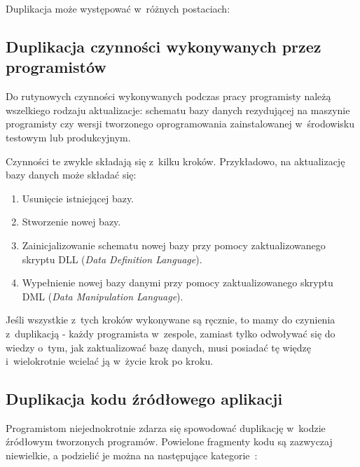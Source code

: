 Duplikacja może występować w~różnych postaciach:


\subsection{Duplikacja czynności wykonywanych przez programistów} \label{sec:tasks_dupl}

Do rutynowych czynności wykonywanych podczas pracy programisty należą wszelkiego rodzaju aktualizacje: schematu bazy danych rezydującej na maszynie programisty czy wersji tworzonego oprogramowania zainstalowanej w~środowisku testowym lub produkcyjnym.

Czynności te zwykle składają się z~kilku kroków. Przykładowo, na aktualizację bazy danych może składać się:

\begin{enumerate}
 \item Usunięcie istniejącej bazy.
 \item Stworzenie nowej bazy.
 \item Zainicjalizowanie schematu nowej bazy przy pomocy zaktualizowanego skryptu DLL (\emph{Data Definition Language}).
 \item Wypełnienie nowej bazy danymi przy pomocy zaktualizowanego skryptu DML (\emph{Data Manipulation Language}).
\end{enumerate}

Jeśli wszystkie z~tych kroków wykonywane są ręcznie, to mamy do czynienia z~duplikacją - każdy programista w~zespole, zamiast tylko odwoływać się do wiedzy o~tym, jak zaktualizować bazę danych, musi posiadać tę więdzę i~wielokrotnie wcielać ją w~życie krok po kroku.


\subsection{Duplikacja kodu źródłowego aplikacji} \label{sec:code_dupl_kinds}

Programistom niejednokrotnie zdarza się spowodować duplikację w~kodzie źródłowym tworzonych programów.
Powielone fragmenty kodu są zazwyczaj niewielkie, a podzielić je można na następujące kategorie~\cite{soft_sol_dupl}:

